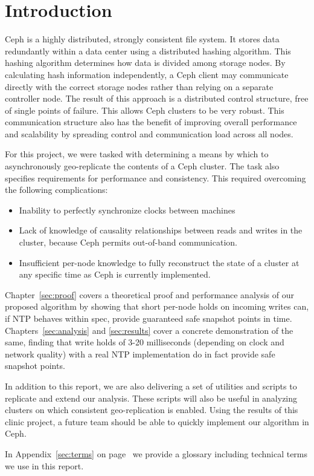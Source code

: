 \chapter{Introduction}
\label{sec:introduction}

Ceph is a highly distributed, strongly consistent file system. It
stores data redundantly within a data center using a distributed hashing
algorithm. This hashing algorithm determines how data is divided among
storage nodes.  By calculating hash information independently, a Ceph
client may communicate directly with the correct storage nodes rather
than relying on a separate controller node. The result of this
approach is a distributed control structure, free of single points of
failure. This allows Ceph clusters to be very robust. This
communication structure also has the benefit of improving overall
performance and scalability by spreading control and communication
load across all nodes.

For this project, we were tasked with determining a means by which to
asynchronously geo-replicate the contents of a Ceph cluster. The task
also specifies requirements for performance and consistency. This
required overcoming the following complications:

\begin{itemize}
\item Inability to perfectly synchronize clocks between machines
\item Lack of knowledge of causality relationships between reads and
  writes in the cluster, because Ceph permits out-of-band
  communication.
\item Insufficient per-node knowledge to fully reconstruct the state
  of a cluster at any specific time as Ceph is currently implemented.
\end{itemize}

Chapter~\ref{sec:proof} covers a theoretical proof and performance
analysis of our proposed algorithm by showing that short per-node holds on
incoming writes can, if NTP behaves within spec, provide guaranteed
safe snapshot points in time. Chapters~\ref{sec:analysis} and
\ref{sec:results} cover a concrete demonstration of the same,
finding that write holds of 3-20 milliseconds (depending on clock and
network quality) with a real NTP implementation do in fact provide
safe snapshot points. 

In addition to this report, we are also delivering a set of utilities
and scripts to replicate and extend our analysis. These scripts will
also be useful in analyzing clusters on which consistent
geo-replication is enabled. Using the results of this clinic project,
a future team should be able to quickly implement our algorithm in
Ceph.

In Appendix~\ref{sec:terms} on page~\pageref{sec:terms} we provide
a glossary including technical terms we use in this report.


